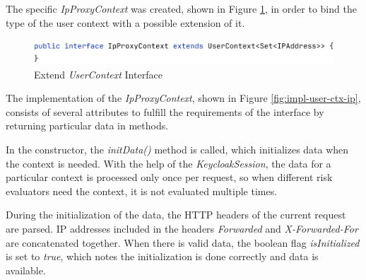 The specific \textit{IpProxyContext} was created, shown in Figure \ref{fig:impl-user-ctx-ifc}, in order to bind the type of the user context with a possible extension of it.

\begin{figure}[htbp]
  \centering
  \includegraphics[width=1\textwidth]{img/sections/6-implementation/proxyIpAddressContextInterface.png}
  \caption{Extend \textit{UserContext} Interface}
  \label{fig:impl-user-ctx-ifc}
\end{figure}

The implementation of the \textit{IpProxyContext}, shown in Figure \ref{fig:impl-user-ctx-ip}, consists of several attributes to fulfill the requirements of the interface by returning particular data in methods.

In the constructor, the \textit{initData()} method is called, which initializes data when the context is needed.
With the help of the \textit{KeycloakSession}, the data for a particular context is processed only once per request, so when different risk evaluators need the context, it is not evaluated multiple times.

During the initialization of the data, the HTTP headers of the current request are parsed.
IP addresses included in the headers \textit{Forwarded} and \textit{X-Forwarded-For} are concatenated together.
When there is valid data, the boolean flag \textit{isInitialized} is set to \textit{true}, which notes the initialization is done correctly and data is available. 

